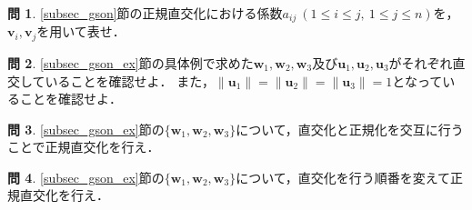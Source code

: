 \documentclass[dvipdfmx]{jsarticle}
\theoremstyle{definition}
\newtheorem{question}{問}[section]
\newcommand{\tp}[1]{{}^{t}#1}
\newcommand{\hs}[1]{\hspace{#1em}}
\newcommand{\tpv}[3]{\tp{[#1 \hs{0.8} #2 \hs{0.8} #3]}}
\begin{document}
\begin{question}
    \label{q_coef}
    \ref{subsec_gson}節の正規直交化における係数$a_{ij} \ (1 \leq i \leq j, \ 1 \leq j \leq n)$を，$\bm{v}_i, \bm{v}_j$を用いて表せ．
\end{question}
\begin{comment}
    答\ref{q_coef}：
    $k \leq j$について，$\bm{v}_i \bot \bm{v}_k$であることに注意する．
    $\bm{v}_i \bot \bm{v}_j$より，
    \begin{align*}
        a_{ij} = - \frac{(\bm{v}_i, \bm{v}_j)}{(\bm{v}_i, \bm{v}_i)}
    \end{align*}
    が得られる．
\end{comment}

\begin{question}
    \label{q_orth}
    \ref{subsec_gson_ex}節の具体例で求めた$\bm{w}_1, \bm{w}_2, \bm{w}_3$及び$\bm{u}_1, \bm{u}_2, \bm{u}_3$がそれぞれ直交していることを確認せよ．
    また，$\|\bm{u}_1\| = \| \bm{u}_2 \| = \| \bm{u}_3 \| = 1$となっていることを確認せよ．
\end{question}

\begin{question}
    \label{q_parallel}
    \ref{subsec_gson_ex}節の$\{ \bm{w}_1, \bm{w}_2, \bm{w}_3 \}$について，直交化と正規化を交互に行うことで正規直交化を行え．
\end{question}

\begin{question}
    \label{q_order}
    \ref{subsec_gson_ex}節の$\{ \bm{w}_1, \bm{w}_2, \bm{w}_3 \}$について，直交化を行う順番を変えて正規直交化を行え．
\end{question}
\begin{comment}
    $\bm{w}_3$から順に直交化を行うと，$\bm{v}_1 = \tpv{1/2}{-1/2}{0}, \ \bm{v}_2 = \tpv{1}{1}{0}, \ \bm{v}_3 = \tpv{0}{0}{1}$となる．
    これを正規化すると，
    \begin{align*}
        \bm{u}_1 = \frac{1}{\sqrt{2}} \begin{bmatrix} 1 \\ -1 \\ 0 \end{bmatrix},
        \bm{u}_2 = \frac{1}{\sqrt{2}} \begin{bmatrix} 1 \\ 1 \\ 0 \end{bmatrix},
        \bm{u}_3 = \begin{bmatrix} 0 \\ 0 \\ 1 \end{bmatrix}
    \end{align*}
\end{comment}
\end{document}
